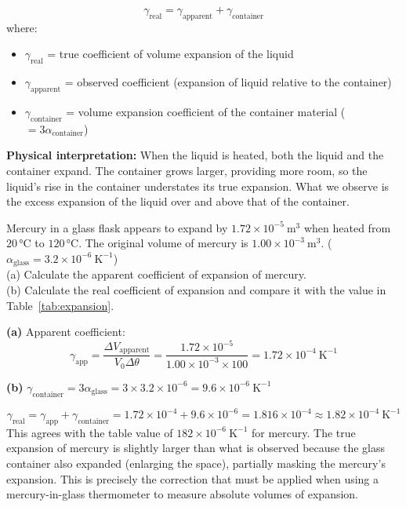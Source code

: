 \begin{lawbox}
\[
  \gamma_{\text{real}} = \gamma_{\text{apparent}}
  + \gamma_{\text{container}}
\]
where:
\begin{itemize}[noitemsep]
  \item $\gamma_{\text{real}}$ = true coefficient of
  volume expansion of the liquid
  \item $\gamma_{\text{apparent}}$ = observed coefficient
  (expansion of liquid relative to the container)
  \item $\gamma_{\text{container}}$ = volume expansion
  coefficient of the container material
  ($= 3\alpha_{\text{container}}$)
\end{itemize}
\textbf{Physical interpretation:} When the liquid is
heated, both the liquid and the container expand.
The container grows larger, providing more room, so
the liquid's rise in the container understates its
true expansion. What we observe is the excess
expansion of the liquid over and above that of the
container.
\end{lawbox}

\begin{examplebox}[13.4]
Mercury in a glass flask appears to expand by
$1.72\times10^{-5}\ \text{m}^3$ when heated from
$20\,°\text{C}$ to $120\,°\text{C}$. The original
volume of mercury is $1.00\times10^{-3}\ \text{m}^3$.
($\alpha_{\text{glass}} = 3.2\times10^{-6}\ \text{K}^{-1}$)\\
(a) Calculate the apparent coefficient of expansion
of mercury.\\
(b) Calculate the real coefficient of expansion and
compare it with the value in Table~\ref{tab:expansion}.
\end{examplebox}

\begin{solutionbox}
\textbf{(a)} Apparent coefficient:
\[
  \gamma_{\text{app}}
  = \frac{\Delta V_{\text{apparent}}}{V_0 \Delta\theta}
  = \frac{1.72\times10^{-5}}{1.00\times10^{-3} \times 100}
  = 1.72\times10^{-4}\ \text{K}^{-1}
\]

\textbf{(b)}
$\gamma_{\text{container}} = 3\alpha_{\text{glass}}
= 3 \times 3.2\times10^{-6}
= 9.6\times10^{-6}\ \text{K}^{-1}$

\[
  \gamma_{\text{real}}
  = \gamma_{\text{app}} + \gamma_{\text{container}}
  = 1.72\times10^{-4} + 9.6\times10^{-6}
  = 1.816\times10^{-4}
  \approx 1.82\times10^{-4}\ \text{K}^{-1}
\]
This agrees with the table value of
$182\times10^{-6}\ \text{K}^{-1}$ for mercury.
The true expansion of mercury is slightly larger than
what is observed because the glass container also
expanded (enlarging the space), partially masking
the mercury's expansion. This is precisely the
correction that must be applied when using a
mercury-in-glass thermometer to measure absolute
volumes of expansion.
\end{solutionbox}

